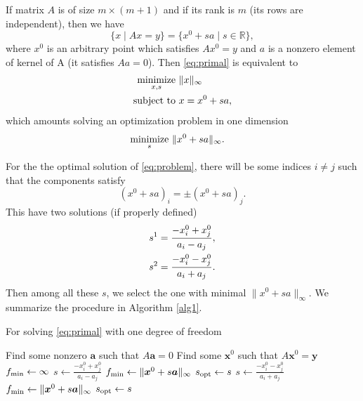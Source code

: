 \documentclass[journal]{IEEEtranTIE}
\theoremstyle{definition}
\newcommand{\R}{{\mathbb R}}
\newcommand{\mnmz}{\operatorname*{minimize}}
\newcommand{\stt}{\operatorname{subject\ to}}
\newcommand{\norm}[1]{\|#1\|}
\begin{document}
If matrix $A$ is of size $m\times(m+1)$ and if its rank is $m$ (its rows are independent), then we have
$$
  \{x\mid Ax=y\} = \{x^0 + sa\mid s\in\R\},
$$
where $x^0$ is an arbitrary point which satisfies $Ax^0=y$ and $a$ is a nonzero element of kernel of A (it satisfies $Aa=0$). Then \eqref{eq:primal} is equivalent to
$$
  \aligned
  \mnmz_{x,s}\ &\norm{x}_\infty \\
  \stt\ &x = x^0 + sa,
  \endaligned
$$ 
which amounts solving an optimization problem in one dimension
\begin{equation}\label{eq:problem}
  \aligned
  \mnmz_{s}\ &\norm{x^0+sa}_\infty.
  \endaligned
\end{equation}

For the the optimal solution of \eqref{eq:problem}, there will be some indices $i\neq j$ such that the components satisfy
$$
  (x^0+sa)_i = \pm(x^0+sa)_j.
$$
This have two solutions (if properly defined)
$$
  \aligned
  s^1 &= \frac{-x^0_i+x_j^0}{a_i-a_j}, \\
  s^2 &= \frac{-x^0_i-x_j^0}{a_i+a_j}.
  \endaligned
$$
Then among all these $s$, we select the one with minimal $\norm{x^0+sa}_\infty$. We summarize the procedure in Algorithm \ref{alg1}.

\begin{algorithm}
  \caption{For solving \eqref{eq:primal} with one degree of freedom}
  \label{alg1}
  \begin{algorithmic}[1]
    \State Find some nonzero $\bm a$ such that $A\bm a=0$
    \State Find some $\bm x^0$ such that $A\bm x^0=\bm y$
    \State $f_{\rm min} \gets \infty$
    \State $s \gets \frac{-x^0_i+x_j^0}{a_i-a_j}$
    \If {$\norm{\bm x^0 + s\bm a}_\infty \le f_{\rm min}$}
    \State $f_{\rm min} \gets \norm{\bm x^0 + s\bm a}_\infty$
    \State $s_{\rm opt} \gets s$
    \EndIf
    \EndIf
    \State $s \gets \frac{-x^0_i-x_j^0}{a_i+a_j}$
    \If {$\norm{\bm x^0 + s\bm a}_\infty \le f_{\rm min}$}
    \State $f_{\rm min} \gets \norm{\bm x^0 + s\bm a}_\infty$
    \State $s_{\rm opt} \gets s$
    \EndIf
    \EndIf
    \EndFor
    \EndFor
  \end{algorithmic}
\end{algorithm}


\end{document}
